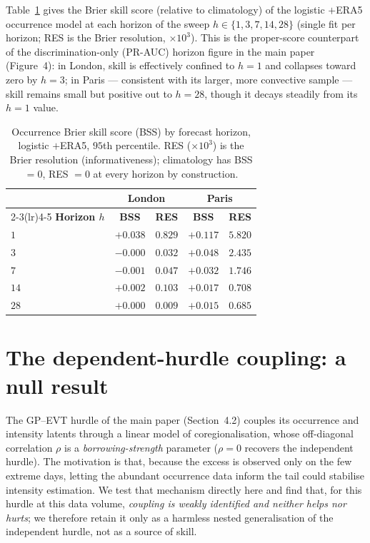 \documentclass[11pt,a4paper]{article}
\begin{document}
Table~\ref{tab:supp-horizon} gives the Brier skill score (relative to
climatology) of the logistic $+$ERA5 occurrence model at each horizon of the
sweep $h\in\{1,3,7,14,28\}$ (single fit per horizon; RES is the Brier
resolution, $\times10^3$). This is the proper-score counterpart of the
discrimination-only (PR-AUC) horizon figure in the main paper (Figure~4): in London, skill is effectively confined to $h=1$
and collapses toward zero by $h=3$; in Paris --- consistent with its larger,
more convective sample --- skill remains small but positive out to $h=28$,
though it decays steadily from its $h=1$ value.

\begin{table}[h]
\centering\small
\caption{Occurrence Brier skill score (BSS) by forecast horizon, logistic
$+$ERA5, $95$th percentile. RES ($\times10^3$) is the Brier resolution
(informativeness); climatology has BSS $=0$, RES $=0$ at every horizon by
construction.}
\label{tab:supp-horizon}
\begin{tabular}{lcccc}
\toprule
& \multicolumn{2}{c}{\textbf{London}} & \multicolumn{2}{c}{\textbf{Paris}}\\
\cmidrule(lr){2-3}\cmidrule(lr){4-5}
\textbf{Horizon $h$} & \textbf{BSS} & \textbf{RES} & \textbf{BSS} & \textbf{RES}\\
\midrule
$1$  & $+0.038$ & $0.829$ & $+0.117$ & $5.820$ \\
$3$  & $-0.000$ & $0.032$ & $+0.048$ & $2.435$ \\
$7$  & $-0.001$ & $0.047$ & $+0.032$ & $1.746$ \\
$14$ & $+0.002$ & $0.103$ & $+0.017$ & $0.708$ \\
$28$ & $+0.000$ & $0.009$ & $+0.015$ & $0.685$ \\
\bottomrule
\end{tabular}
\end{table}

\section{The dependent-hurdle coupling: a null result}
\label{sec:supp-coupling}

The GP--EVT hurdle of the main paper (Section~4.2) couples its occurrence and
intensity latents through a linear model of coregionalisation, whose off-diagonal
correlation $\rho$ is a \emph{borrowing-strength} parameter ($\rho=0$ recovers the
independent hurdle). The motivation is that, because the excess is observed only on
the few extreme days, letting the abundant occurrence data inform the tail could
stabilise intensity estimation. We test that mechanism directly here and find
that, for this hurdle at this data volume, \emph{coupling is weakly identified and
neither helps nor hurts}; we therefore retain it only as a harmless nested
generalisation of the independent hurdle, not as a source of skill.
\end{document}
